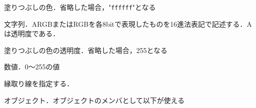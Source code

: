 \begin{description}
{\nopagebreak
\item[\texttt{Fill}] \mbox{}
    \vspace{-1zw}
    \begin{description}
    \setlength{\itemsep}{-1.5\itemsep}
    \item[説明] 塗りつぶしの色．省略した場合，"{\tt ffffff}"となる
    \item[値] 文字列．ARGBまたはRGBを各8bitで表現したものを16進法表記で記述する．Aは透明度である．
    \end{description}
}
\vspace{-1zw}
{\nopagebreak
\item[\texttt{Alpha}] \mbox{}
    \vspace{-1zw}
    \begin{description}
    \setlength{\itemsep}{-1.5\itemsep}
    \item[説明] 塗りつぶしの色の透明度．省略した場合，255となる
    \item[値] 数値．0～255の値
    \end{description}
}
\vspace{-1zw}
\item[\texttt{Pen}] \mbox{}
    \vspace{-1zw}
    \begin{description}
    \setlength{\itemsep}{-1.5\itemsep}
    \item[説明] 縁取り線を指定する．
    \item[値] オブジェクト．オブジェクトのメンバとして以下が使える


\end{description}
\end{description}
